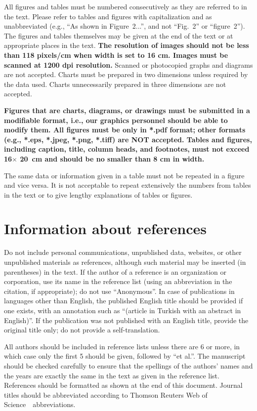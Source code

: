 \documentclass{elektr}
\begin{document}
All figures and tables must be numbered consecutively as they are referred to in the text. Please refer to tables and figures with capitalization and as unabbreviated (e.g., ``As shown in Figure~2...'', and not ``Fig.~2'' or ``figure~2''). The figures and tables themselves may be given at the end of the text or at appropriate places in the text. \textbf{The resolution of images should not be less than 118 pixels/cm when width is set to 16 cm. Images must be scanned at 1200 dpi resolution.} Scanned or photocopied graphs and diagrams are not accepted. Charts must be prepared in two dimensions unless required by the data used. Charts unnecessarily prepared in three dimensions are not accepted.

\textbf{Figures that are charts, diagrams, or drawings must be submitted in a modifiable format, i.e., our graphics personnel should be able to modify them. All figures must be only in *.pdf format; other formats (e.g., *.eps, *.jpeg, *.png, *.tiff) are NOT accepted. Tables and figures, including caption, title, column heads, and footnotes, must not exceed 16$\times$ 20~cm and should be no smaller than 8 cm in width.} 
 
The same data or information given in a table must not be repeated in a figure and vice versa. It is not acceptable to repeat extensively the numbers from tables in the text or to give lengthy explanations of tables or figures.

\section{Information about references}
Do not include personal communications, unpublished data, websites, or other unpublished materials as references, although such material may be inserted (in parentheses) in the text. If the author of a reference is an organization or corporation, use its name in the reference list (using an abbreviation in the citation, if appropriate); do not use ``Anonymous''. In case of publications in languages other than English, the published English title should be provided if one exists, with an annotation such as ``(article in Turkish with an abstract in English)''. If the publication was not published with an English title, provide the original title only; do not provide a self-translation.

All authors should be included in reference lists unless there are 6 or more, in which case only the first 5 should be given, followed by ``et al.''. The manuscript should be checked carefully to ensure that the spellings of the authors' names and the years are exactly the same in the text as given in the reference list. References should be formatted as shown at the end of this document. Journal titles should be abbreviated according to Thomson Reuters Web of Science~\textcopyright~abbreviations.
\end{document}
